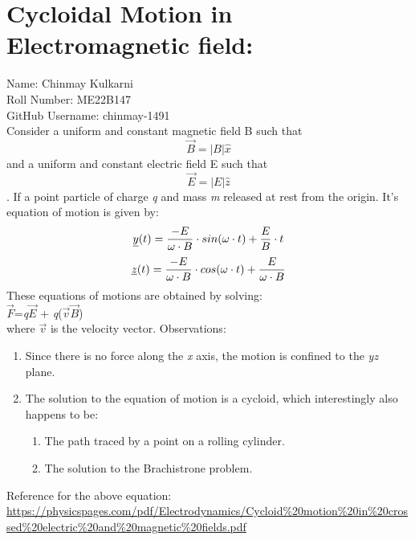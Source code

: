 \section{Cycloidal Motion in Electromagnetic field:}

Name: Chinmay Kulkarni\\
Roll Number: ME22B147\\
GitHub Username: chinmay-1491 \\

Consider a uniform and constant magnetic field B such that$$\vec{B} = |B|\hat{x}$$ and a uniform and constant electric field E such that$$\vec{E} = |E|\hat{z}$$. If a point particle of charge \emph{q} and mass \emph{m} released at rest from the origin. It's equation of motion is given by:
\begin{equation}
    \emph{y}(t)=\frac{-E}{\omega\cdot B}\cdot sin(\omega\cdot t) + \frac{E}{B}\cdot t 
\end{equation}
\begin{equation}
    \emph{z}(t)=\frac{-E}{\omega\cdot B}\cdot cos(\omega\cdot t) + \frac{E}{\omega\cdot B}
\end{equation}
These equations of motions are obtained by solving:\\
$\vec{F}$=\emph{q}\cdot $\vec{E}$ + \emph{q}\cdot($\vec{v}$\times$\vec{B}$) \\
where $\vec{v}$ is the velocity vector.
Observations:
\begin{enumerate}
    \item Since there is no force along the \emph{x} axis, the motion is confined to the \emph{yz} plane.
    \item The solution to the equation of motion is a cycloid, which interestingly also happens to be:
    \begin{enumerate}
      \item The path traced by a point on a rolling cylinder.
      \item The solution to the Brachistrone problem.
    \end{enumerate}
\end{enumerate}
Reference for the above equation:
\url{https://physicspages.com/pdf/Electrodynamics/Cycloid%20motion%20in%20crossed%20electric%20and%20magnetic%20fields.pdf}
